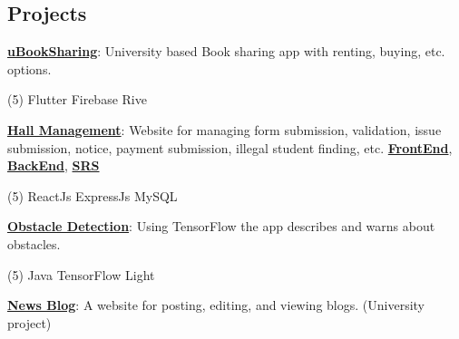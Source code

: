 \documentclass[mm]{simple_style}
\let\oldhref\href
\renewcommand{\href}[2]{\oldhref{#1}{\bfseries#2}}
\begin{document}
\begin{resume}
\section{Projects}
{\href{https://github.com/Sourav9063/uBookSharing}{uBookSharing}}: University based Book sharing app with renting, buying, etc. options.\\
\vspace{-4mm}
\begin{tasks}[style=itemize ,label=\textcolor{gray}{$\bullet$}](5)
\task Flutter
\task Firebase
\task Rive
\end{tasks}
\vspace{-3.5mm}
\href{https://sourav9063.github.io/hall_management_rf/}{Hall Management}: Website for managing form submission, validation, issue submission, notice, payment submission, illegal student finding, etc. \href{https://github.com/Sourav9063/hall_management_rf}{FrontEnd}, \href{https://github.com/Sourav9063/Backend_hall_management}{BackEnd},
\href{https://docs.google.com/document/d/1Sy9VO97rWJrOYCMgWRGJz4H2q3vJPSVCpLRm5AUOsO8/edit?usp=sharing}{SRS}\\
\vspace{-4mm}
\begin{tasks}[style=itemize ,label=\textcolor{gray}{$\bullet$}](5)
\task ReactJs 
\task ExpressJs
\task MySQL 
\end{tasks}
\vspace{-3.5mm}
\href{https://github.com/Sourav9063/obstacles_detection}{Obstacle Detection}: Using TensorFlow the app describes and warns about obstacles.\\
\vspace{-4mm}
\begin{tasks}[style=itemize ,label=\textcolor{gray}{$\bullet$}](5)
\task Java
\task TensorFlow Light
\end{tasks}
\vspace{-3.5mm}
\href{https://github.com/Sourav9063/Blog-CRUD-by-Nodejs}{News Blog}: A website for posting, editing, and viewing blogs. (University project)\\

\end{resume}
\end{document}
